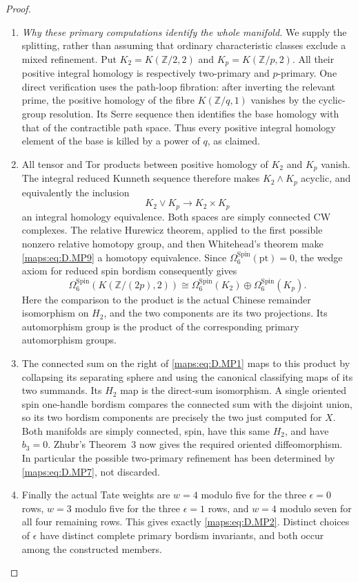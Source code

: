 \begin{proof}
\begin{enumerate}[label=\arabic*.,leftmargin=*]
\item \emph{Why these primary computations identify the whole manifold.}
We supply the splitting, rather than assuming that ordinary
characteristic classes exclude a mixed refinement. Put
$K_2=K(\mathbb Z/2,2)$ and $K_p=K(\mathbb Z/p,2)$.
All their positive integral homology is respectively two-primary
and $p$-primary. One direct verification uses the path-loop
fibration: after inverting the relevant prime, the positive
homology of the fibre $K(\mathbb Z/q,1)$ vanishes by the
cyclic-group resolution. Its Serre sequence then identifies
the base homology with that of the contractible path space.
Thus every positive integral homology element of the base is
killed by a power of $q$, as claimed.

\item All tensor and Tor products between positive homology of
$K_2$ and $K_p$ vanish. The integral reduced Kunneth sequence
therefore makes $K_2\wedge K_p$ acyclic, and equivalently
the inclusion
\[
                K_2\vee K_p\longrightarrow K_2\times K_p
                                                        \tag{D.MP9}\label{maps:eq:D.MP9}
\]
an integral homology equivalence. Both spaces are simply
connected CW complexes. The relative Hurewicz theorem,
applied to the first possible nonzero relative homotopy group,
and then Whitehead's theorem make \eqref{maps:eq:D.MP9} a homotopy equivalence.
Since $\Omega^{\mathrm{Spin}}_6(\mathrm{pt})=0$, the wedge
axiom for reduced spin bordism consequently gives
\[
 \Omega^{\mathrm{Spin}}_6(K(\mathbb Z/(2p),2))
 \cong\Omega^{\mathrm{Spin}}_6(K_2)
       \oplus\Omega^{\mathrm{Spin}}_6(K_p).               \tag{D.MP10}\label{maps:eq:D.MP10}
\]
Here the comparison to the product is the actual Chinese
remainder isomorphism on $H_2$, and the two components are
its two projections. Its automorphism group is the product
of the corresponding primary automorphism groups.

\item The connected sum on the right of \eqref{maps:eq:D.MP1} maps to this product
by collapsing its separating sphere and using the canonical
classifying maps of its two summands. Its $H_2$ map is the
direct-sum isomorphism. A single oriented spin one-handle
bordism compares the connected sum with the disjoint union,
so its two bordism components are precisely the two just
computed for $X$. Both manifolds are simply connected, spin,
have this same $H_2$, and have $b_3=0$. Zhubr's Theorem~3
\cite[p.795]{manZhubr75} now gives the required oriented
diffeomorphism. In particular the possible two-primary
refinement has been determined by \eqref{maps:eq:D.MP7}, not discarded.

\item Finally the actual Tate weights are $w=4$ modulo five for
the three $\epsilon=0$ rows, $w=3$ modulo five for the three
$\epsilon=1$ rows, and $w=4$ modulo seven for all four
remaining rows. This gives exactly \eqref{maps:eq:D.MP2}. Distinct choices
of $\epsilon$ have distinct complete primary bordism
invariants, and both occur among the constructed members.
\end{enumerate}
\end{proof}

